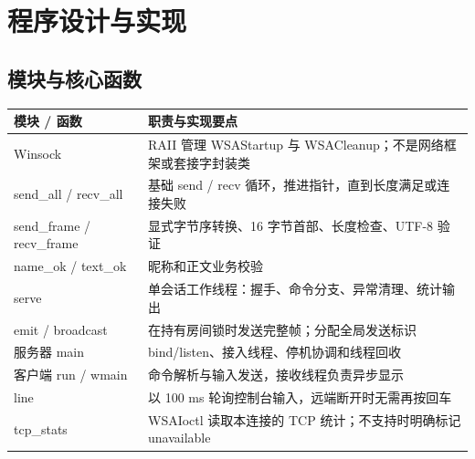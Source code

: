 \documentclass[UTF8,notitlepage,11pt]{ctexart}
\begin{document}
\section{程序设计与实现}
\subsection{模块与核心函数}
\begin{table}[H]\centering\small
\begin{tabularx}{\textwidth}{p{}X}\toprule
模块 / 函数 & 职责与实现要点\\\midrule
Winsock & RAII 管理 WSAStartup 与 WSACleanup；不是网络框架或套接字封装类\\
send\_all / recv\_all & 基础 send / recv 循环，推进指针，直到长度满足或连接失败\\
send\_frame / recv\_frame & 显式字节序转换、16 字节首部、长度检查、UTF-8 验证\\
name\_ok / text\_ok & 昵称和正文业务校验\\
serve & 单会话工作线程：握手、命令分支、异常清理、统计输出\\
emit / broadcast & 在持有房间锁时发送完整帧；分配全局发送标识\\
服务器 main & bind/listen、接入线程、停机协调和线程回收\\
客户端 run / wmain & 命令解析与输入发送，接收线程负责异步显示\\
line & 以 100 ms 轮询控制台输入，远端断开时无需再按回车\\
tcp\_stats & WSAIoctl 读取本连接的 TCP 统计；不支持时明确标记 unavailable\\\bottomrule
\end{tabularx}\end{table}
\end{document}
